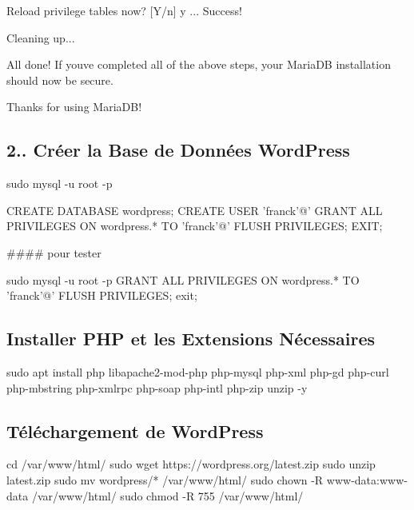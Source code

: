 Reload privilege tables now? \mbox{[}Y/n\mbox{]} y ... Success!

Cleaning up...

All done! If you\textquotesingle{}ve completed all of the above steps, your Maria\+DB installation should now be secure.

Thanks for using Maria\+D\+B!

\subsection*{2.. Créer la Base de Données Word\+Press}


\begin{DoxyCode}
sudo mysql -u root -p
\end{DoxyCode}



\begin{DoxyCode}
CREATE DATABASE wordpress;
CREATE USER 'franck'@'%
GRANT ALL PRIVILEGES ON wordpress.* TO 'franck'@'%
FLUSH PRIVILEGES;
EXIT;
\end{DoxyCode}


\#\#\#\# pour tester 
\begin{DoxyCode}
sudo mysql -u root -p
GRANT ALL PRIVILEGES ON wordpress.* TO 'franck'@'%
FLUSH PRIVILEGES;
exit;
\end{DoxyCode}
 \subsection*{Installer P\+HP et les Extensions Nécessaires}


\begin{DoxyCode}
sudo apt install php libapache2-mod-php php-mysql php-xml php-gd php-curl php-mbstring php-xmlrpc php-soap
       php-intl php-zip unzip -y
\end{DoxyCode}


\subsection*{Téléchargement de Word\+Press}


\begin{DoxyCode}
cd /var/www/html/
sudo wget https://wordpress.org/latest.zip
sudo unzip latest.zip
sudo mv wordpress/* /var/www/html/
sudo chown -R www-data:www-data /var/www/html/
sudo chmod -R 755 /var/www/html/
\end{DoxyCode}


